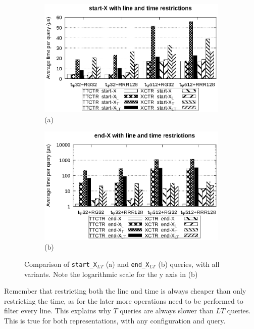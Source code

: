\documentclass[runningheads]{llncs}
\begin{document}
\begin{figure}[hbt!]
\begin{subfigure}{0.5\linewidth}
\includegraphics[width=\linewidth]{experiments/start.eps}
\vspace{-12pt}
\caption{\footnotesize (a)}
\vspace{-12pt}
\end{subfigure}%
\begin{subfigure}{0.5\linewidth}
\includegraphics[width=\linewidth]{experiments/end.eps}
\vspace{-12pt}
\caption{\footnotesize (b)}
\vspace{-12pt}
\end{subfigure}
\caption{Comparison of \texttt{start\_X$_{LT}$} (a) and \texttt{end\_X$_{LT}$} (b) queries, with all variants. Note the logarithmic scale for the y axis in (b)}
\label{fig:start}
\end{figure}

Remember that restricting both the line and time is always cheaper than only restricting the time, as for the later more operations need to be performed to filter every line. This explains why $T$ queries are always slower than $LT$ queries. This is true for both representations, with any configuration and query.
\end{document}

